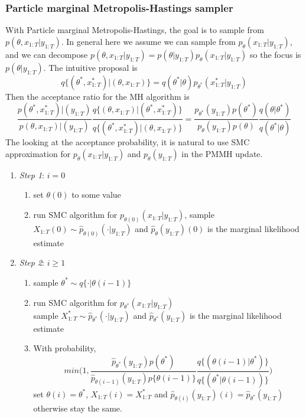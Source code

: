 \documentclass{article}\usepackage[]{graphicx}\usepackage[]{color}
\theoremstyle{definition}
\begin{document}
\subsubsection{Particle marginal Metropolis-Hastings sampler}
With Particle marginal Metropolis-Hastings, the goal is to sample from $p(\theta, x_{1:T} | y_{1:T})$. In general here we assume we can sample from $p_\theta( x_{1:T} | y_{1:T})$, and we can decompose $p(\theta, x_{1:T} | y_{1:T}) = p(\theta | y_{1:T}) p_\theta(x_{1:T} | y_{1:T})$ so the focus is $p(\theta|y_{1:T})$. The intuitive proposal is
\begin{equation*}
  q \{ (\theta^*, x^*_{1:T}) | (\theta, x_{1:T}) \} = q(\theta^* | \theta) p_{\theta^*}(x^*_{1:T} | y_{1:T})
\end{equation*}
Then the acceptance ratio for the MH algorithm is
\begin{equation}
 \frac{p(\theta^*, x^*_{1:T})|(y_{1:T})}{p(\theta, x_{1:T})|(y_{1:T})}\frac{q \{ (\theta, x_{1:T}) | (\theta^*, x^*_{1:T}) \}}{q \{ (\theta^*, x^*_{1:T}) | (\theta, x_{1:T}) \}} = \frac{p_{\theta^*}(y_{1:T})p(\theta^*)}{p_\theta(y_{1:T})p(\theta)}\frac{q(\theta|\theta^*)}{q(\theta^*|\theta)}
\end{equation}
The looking at the acceptance probability, it is natural to use SMC approximation for $p_\theta(x_{1:T}|y_{1:T})$ and $p_\theta(y_{1:T})$ in the PMMH update.

\begin{enumerate}
  \item[] \textit{Step 1}: $i=0$
  \begin{enumerate}
    \item set $\theta(0)$ to some value
    \item run SMC algorithm for $p_{\theta(0)}(x_{1:T}|y_{1:T})$, sample $X_{1:T}(0) \sim \hat{p}_{\theta(0)}(\cdot|y_{1:T})$ and $\hat{p}_\theta(y_{1:T})(0)$ is the marginal likelihood estimate
  \end{enumerate}
%
  \item[] \textit{Step 2}: $i \geq 1$
  \begin{enumerate}
    \item sample $\theta^* \sim q\{ \cdot | \theta(i-1) \}$
    \item run SMC algorithm for $p_{\theta^*}(x_{1:T}|y_{1:T})$ \\
    sample $X^*_{1:T} \sim \hat{p}_{\theta^*}(\cdot|y_{1:T})$ and $\hat{p}_{\theta^*}(y_{1:T})$ is the marginal likelihood estimate
    \item With probability,
    \begin{equation*}
       min \Bigg( 1, \frac{\hat{p}_{\theta^*}(y_{1:T})p(\theta^*)}{\hat{p}_{\theta(i-1)}(y_{1:T})p\{\theta(i-1)\}}\frac{q\{(\theta(i-1)|\theta^*)\}}{q\{(\theta^*|\theta(i-1))\}} \Bigg)
    \end{equation*}
    set $\theta(i) = \theta^*$, $X_{1:T}(i) = X^*_{1:T}$ and $\hat{p}_{\theta(i)}(y_{1:T})(i) = \hat{p}_{\theta^*}(y_{1:T})$ otherwise stay the same.
  \end{enumerate}
\end{enumerate}
\end{document}
